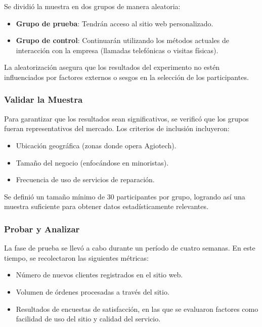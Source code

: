 Se dividió la muestra en dos grupos de manera aleatoria:

\begin{itemize}
	\item \textbf{Grupo de prueba}: Tendrán acceso al sitio web personalizado.

	\item \textbf{Grupo de control}: Continuarán utilizando los métodos actuales de
	      interacción con la empresa (llamadas telefónicas o visitas físicas).
\end{itemize}

La aleatorización asegura que los resultados del experimento no estén
influenciados por factores externos o sesgos en la selección de los
participantes.

\subsubsection{Validar la Muestra}

Para garantizar que los resultados sean significativos, se verificó que los
grupos fueran representativos del mercado. Los criterios de inclusión incluyeron:

\begin{itemize}
	\item Ubicación geográfica (zonas donde opera Agiotech).

	\item Tamaño del negocio (enfocándose en minoristas).

	\item Frecuencia de uso de servicios de reparación.
\end{itemize}

Se definió un tamaño mínimo de 30 participantes por grupo, logrando así una muestra
suficiente para obtener datos estadísticamente relevantes.

\subsubsection{Probar y Analizar}

La fase de prueba se llevó a cabo durante un período de cuatro semanas. En este tiempo,
se recolectaron las siguientes métricas:

\begin{itemize}
	\item Número de nuevos clientes registrados en el sitio web.

	\item Volumen de órdenes procesadas a través del sitio.

	\item Resultados de encuestas de satisfacción, en las que se evaluaron
	      factores como facilidad de uso del sitio y calidad del servicio.
\end{itemize}

